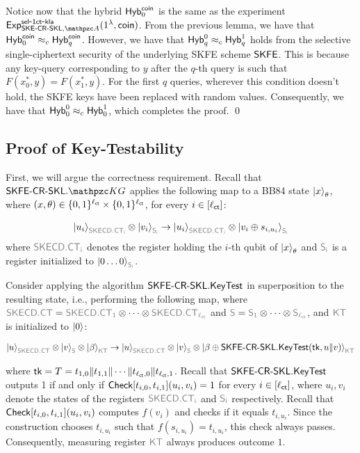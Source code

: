 Notice now that the hybrid $\Hyb_0^\coin$ is the same as the
experiment $\expc{\SKECRSKL,\qA}{sel}{1ct}{kla}\allowbreak(1^\secp,\coin)$. From
the previous lemma, we have that $\Hyb_0^\coin \approx_c
\Hyb_q^\coin$. However, we have that $\Hyb_q^0 \approx_c \Hyb_q^1$
holds from the selective single-ciphertext security of the underlying
SKFE scheme $\SKFE$. This is because any key-query corresponding to
$y$ after the $q$-th query is such that $F(x_0^*, y) = F(x_1^*, y)$.
For the first $q$ queries, wherever this condition doesn't hold, the
SKFE keys have been replaced with random values. Consequently, we have
that $\Hyb_0^0 \approx_c \Hyb_0^1$, which completes the proof. \qed

\subsection{Proof of Key-Testability}\label{proof:kt_SKFE}
First, we will argue the correctness requirement. Recall that
$\SKFESKL.\qKG$ applies the following map to a BB84 state
$\ket{x}_\theta$, where $(x, \theta) \in
\bit^{\ctlen}\times\bit^{\ctlen}$, for every $i \in [\ctlen]$:

\begin{align}
\ket{u_i}_{\qreg{SKECD.CT_i}}\tensor\ket{v_i}_{\qreg{S_i}}
\ra
\ket{u_i}_{\qreg{SKECD.CT_i}}\tensor\ket{v_i\oplus
s_{i,u_i}}_{\qreg{S_i}}
\end{align}
where $\qreg{SKECD.CT_i}$ denotes the register holding the $i$-th
qubit of $\ket{x}_\theta$ and $\qreg{S_i}$ is a register initialized
to $\ket{0\ldots0}_{\qreg{S_i}}$.

Consider applying the algorithm $\SKFESKL.\KeyTest$ in
superposition to the resulting state, i.e., performing the following
map, where $\qreg{\SKECD.CT} = \qreg{\SKECD.CT_1} \otimes \cdots
\otimes \qreg{\SKECD.CT_{\ctlen}}$ and $\qreg{S} =
\qreg{S_1} \otimes \cdots \otimes \qreg{S_{\ctlen}}$, and
$\qreg{KT}$ is initialized to $\ket{0}$:

\begin{align}
\ket{u}_{\qreg{SKECD.
CT}}\tensor\ket{v}_{\qreg{S}}\tensor\ket{\beta}_{\qreg{KT}} \ra
\ket{u}_{\qreg{SKECD.
CT}}\tensor\ket{v}_{\qreg{S}}\tensor\ket{\beta\oplus\SKFESKL.
\KeyTest(\tk, u\|v)}_{\qreg{KT}}
\end{align}

where $\tk = T = t_{1, 0}\|t_{1, 1} \| \cdots \| t_{\ctlen,
0}\|t_{\ctlen, 1}$. Recall that $\SKFESKL.\KeyTest$
outputs 1 if
and only if $\Check[t_{i,0}, t_{i, 1}](u_i,
v_i) = 1$ for every $i
\in [\ctlen]$, where $u_i, v_i$ denote the states of the registers
$\qreg{SKECD.CT_i}$ and $\qreg{S_i}$ respectively.
Recall that $\Check[t_{i,0},t_{i,1}](u_i, v_i)$ computes $f(v_i)$
and checks if it equals $t_{i, u_i}$. Since the construction chooses
$t_{i, u_i}$ such that $f(s_{i, u_i}) = t_{i, u_i}$, this check
always passes. Consequently, measuring register $\qreg{KT}$ always
produces outcome $1$.

